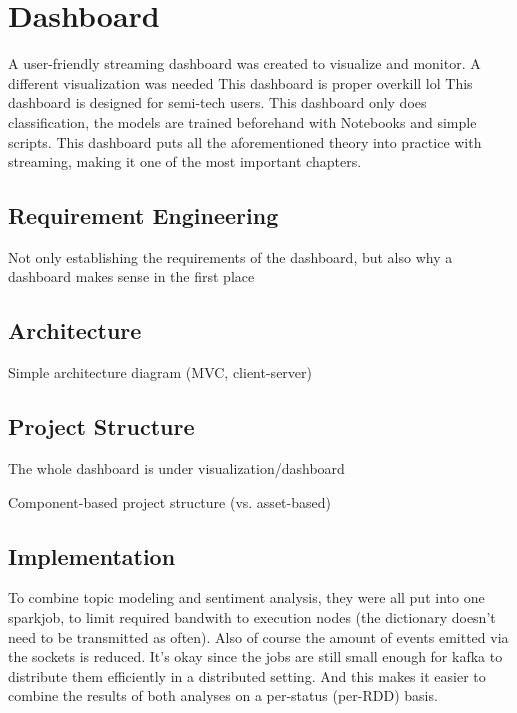 \chapter{Dashboard}

\label{ch:dashboard}

A user-friendly streaming dashboard was created to visualize and monitor.
A different visualization was needed
This dashboard is proper overkill lol
This dashboard is designed for semi-tech users.
This dashboard only does classification, the models are trained beforehand with Notebooks and simple scripts.
This dashboard puts all the aforementioned theory into practice with streaming, making it one of the most important chapters.

\section{Requirement Engineering}
\label{sec:requirementEngineering}

Not only establishing the requirements of the dashboard, but also why a dashboard makes sense in the first place

\section{Architecture}
\label{sec:architecture}

Simple architecture diagram (MVC, client-server)

\section{Project Structure}
\label{sec:projectStructure}

The whole dashboard is under visualization/dashboard

Component-based project structure (vs. asset-based)

\section{Implementation}
\label{sec:implementation}

To combine topic modeling and sentiment analysis, they were all put into one sparkjob, to limit required bandwith to execution nodes (the dictionary doesn't need to be transmitted as often).
Also of course the amount of events emitted via the sockets is reduced.
It's okay since the jobs are still small enough for kafka to distribute them efficiently in a distributed setting.
And this makes it easier to combine the results of both analyses on a per-status (per-RDD) basis.

